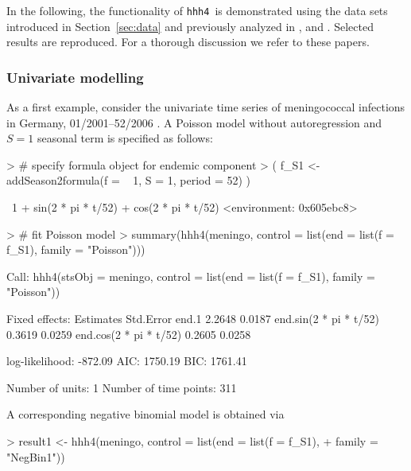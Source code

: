 \documentclass[a4paper,11pt]{article}
\newcommand{\hhh}{\texttt{hhh4}}
\begin{document}
In the following, the functionality of \hhh\ is demonstrated using
the data sets introduced in Section~\ref{sec:data}
and previously analyzed in \cite{paul-etal-2008}, \cite{paul-held-2011} and 
\cite{herzog-etal-2010}.
Selected results are reproduced. For a thorough discussion 
we refer to these papers.

\subsubsection{Univariate modelling}

As a first example, consider the univariate time series of meningococcal infections
in Germany, 01/2001--52/2006 \citep[cf.~Tab.~1 in ][]{paul-etal-2008}.
A Poisson model without autoregression and $S=1$ seasonal term is specified 
as follows:
\begin{Schunk}
\begin{Sinput}
> # specify formula object for endemic component
> ( f_S1 <- addSeason2formula(f = ~ 1, S = 1, period = 52) )
\end{Sinput}
\begin{Soutput}
~1 + sin(2 * pi * t/52) + cos(2 * pi * t/52)
<environment: 0x605ebc8>
\end{Soutput}
\begin{Sinput}
> # fit Poisson model
> summary(hhh4(meningo, control = list(end = list(f = f_S1), family = "Poisson")))
\end{Sinput}
\begin{Soutput}
Call: 
hhh4(stsObj = meningo, control = list(end = list(f = f_S1), family = "Poisson"))


Fixed effects: 
                        Estimates  Std.Error
end.1                      2.2648     0.0187
end.sin(2 * pi * t/52)     0.3619     0.0259
end.cos(2 * pi * t/52)     0.2605     0.0258

log-likelihood:    -872.09 
AIC:               1750.19 
BIC:               1761.41 

Number of units:          1 
Number of time points:    311 
\end{Soutput}
\end{Schunk}
A corresponding negative binomial model is obtained via
\begin{Schunk}
\begin{Sinput}
> result1 <- hhh4(meningo, control = list(end = list(f = f_S1), 
+                                         family = "NegBin1")) 
\end{Sinput}
\end{Schunk}
\end{document}
